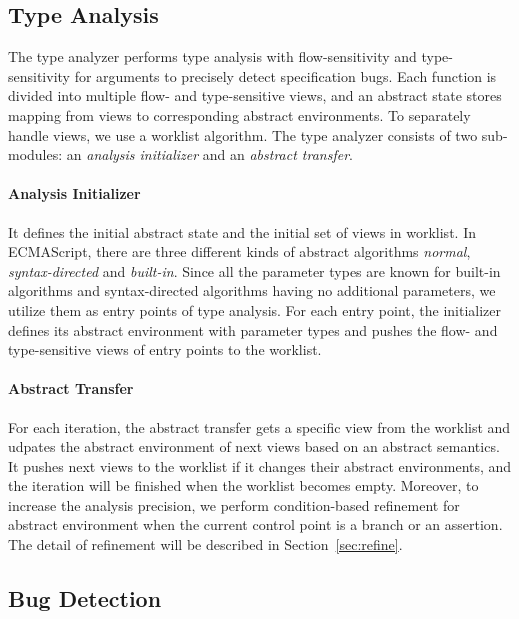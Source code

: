 \subsection{Type Analysis}\label{sec:overview-type-analysis}

The type analyzer performs type analysis with flow-sensitivity and
type-sensitivity for arguments to precisely detect specification bugs.  Each
function is divided into multiple flow- and type-sensitive views, and an
abstract state stores mapping from views to corresponding abstract environments.
To separately handle views, we use a worklist algorithm.  The type analyzer
consists of two sub-modules: an \textit{analysis initializer} and an
\textit{abstract transfer}.

\paragraph{Analysis Initializer} It defines the initial abstract state and the
initial set of views in worklist.  In ECMAScript, there are three different
kinds of abstract algorithms \textit{normal}, \textit{syntax-directed} and
\textit{built-in}.  Since all the parameter types are known for built-in
algorithms and syntax-directed algorithms having no additional parameters, we
utilize them as entry points of type analysis.  For each entry point, the
initializer defines its abstract environment with parameter types and pushes the
flow- and type-sensitive views of entry points to the worklist.

\paragraph{Abstract Transfer} For each iteration, the abstract transfer gets a
specific view from the worklist and udpates the abstract environment of next
views based on an abstract semantics.  It pushes next views to the worklist if
it changes their abstract environments, and the iteration will be finished when
the worklist becomes empty.  Moreover, to increase the analysis precision, we
perform condition-based refinement for abstract environment when the current
control point is a branch or an assertion.  The detail of refinement will be
described in Section~\ref{sec:refine}.


\subsection{Bug Detection}\label{sec:overview-bug-detect}

